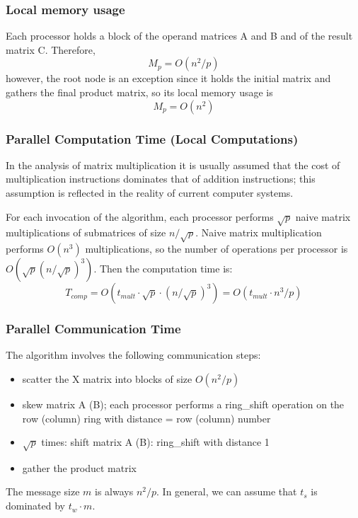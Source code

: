 \documentclass{article}
\begin{document}
\subsubsection{Local memory usage}

Each processor holds a block of the operand matrices A and B and of the result
matrix C. Therefore, $$M_p = O(n^2/p)$$ however, the root node is an exception
since it holds the initial matrix and gathers the final product matrix, so its
local memory usage is $$M_p = O(n^2)$$

\subsubsection{Parallel Computation Time (Local Computations)}

In the analysis of matrix multiplication it is usually assumed that the cost of
multiplication instructions dominates that of addition instructions; this
assumption is reflected in the reality of current computer systems.

For each invocation of the algorithm, each processor performs $\sqrt{p}$ naive
matrix multiplications of submatrices of size $n/\sqrt{p}$. Naive matrix
multiplication performs $O(n^3)$ multiplications, so the number of operations
per processor is $O(\sqrt{p}(n/\sqrt{p})^3)$. Then the
computation time is: $$T_{{comp}} = O(t_{{mult}} \cdot \sqrt{p} \cdot
(n/\sqrt{p})^3) = O(t_{{mult}} \cdot n^3 / p)$$


\subsubsection{Parallel Communication Time}

The algorithm involves the following communication steps:
\begin{itemize}
	\item scatter the X matrix into blocks of size $O(n^2/p)$
	\item skew matrix A (B); each processor performs a ring\_shift operation on
	the row (column) ring with distance = row (column) number
	\item $\sqrt{p}$ times: shift matrix A (B): ring\_shift with distance 1
	\item gather the product matrix
\end{itemize}

The message size $m$ is always $n^2/p$. In general, we can assume that $t_s$ is
dominated by $t_w \cdot m$.
\end{document}
